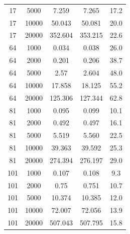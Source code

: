 \documentclass{deliverablereport}
\begin{document}
\begin{small}
\begin{center}
\begin{longtable}{|c|c|c|c|c|}
17&5000&7.259&7.265&17.2\\
17&10000&50.043&50.081&20.0\\
17&20000&352.604&353.215&22.6\\
64&1000&0.034&0.038&26.0\\
64&2000&0.201&0.206&38.7\\
64&5000&2.57&2.604&48.0\\
64&10000&17.858&18.125&55.2\\
64&20000&125.306&127.344&62.8\\
81&1000&0.095&0.099&10.1\\
81&2000&0.492&0.497&16.1\\
81&5000&5.519&5.560&22.5\\
81&10000&39.363&39.592&25.3\\
81&20000&274.394&276.197&29.0\\
101&1000&0.107&0.108&9.3\\
101&2000&0.75&0.751&10.7\\
101&5000&10.374&10.385&12.0\\
101&10000&72.007&72.056&13.9\\
101&20000&507.043&507.795&15.8\\
  \end{longtable}
\end{center}
  

\end{small}
\end{document}
